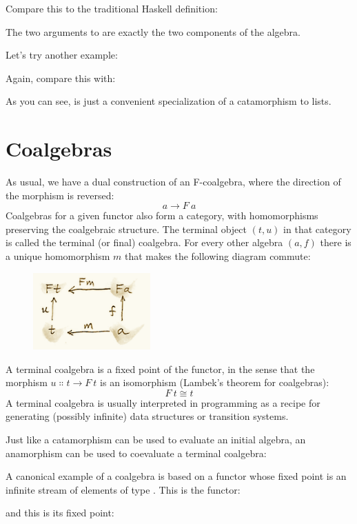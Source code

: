 Compare this to the traditional Haskell definition:

The two arguments to  are exactly the two components of
the algebra.

Let's try another example:

Again, compare this with:

As you can see,  is just a convenient specialization of a
catamorphism to lists.

\section{Coalgebras}

As usual, we have a dual construction of an F-coalgebra, where the
direction of the morphism is reversed:
\[a \to F\ a\]
Coalgebras for a given functor also form a category, with homomorphisms
preserving the coalgebraic structure. The terminal object
$(t, u)$ in that category is called the terminal (or final)
coalgebra. For every other algebra $(a, f)$ there is a unique
homomorphism $m$ that makes the following diagram commute:

\begin{figure}[H]
\centering
\includegraphics[width=0.4\textwidth]{images/alg7.png}
\end{figure}

\noindent
A terminal coalgebra is a fixed point of the functor, in the sense that
the morphism $u \Colon t \to F\ t$ is an isomorphism
(Lambek's theorem for coalgebras):
\[F\ t \cong t\]
A terminal coalgebra is usually interpreted in programming as a recipe
for generating (possibly infinite) data structures or transition
systems.

Just like a catamorphism can be used to evaluate an initial algebra, an
anamorphism can be used to coevaluate a terminal coalgebra:

A canonical example of a coalgebra is based on a functor whose fixed
point is an infinite stream of elements of type . This is the
functor:

and this is its fixed point:


